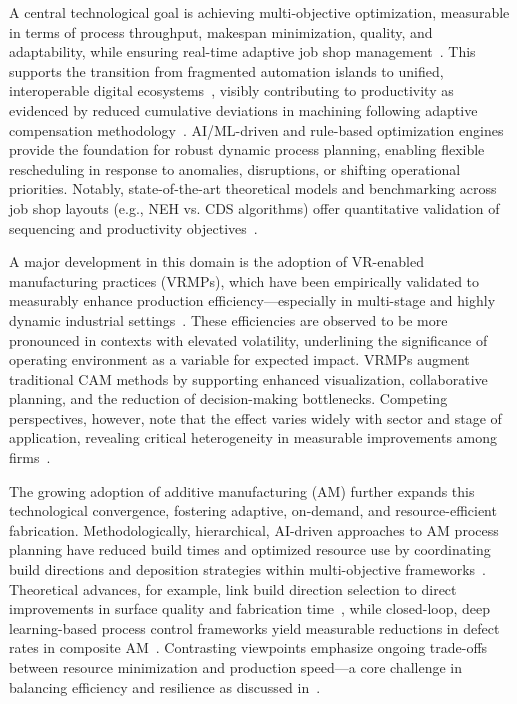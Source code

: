 \documentclass[sigconf]{acmart}
\begin{document}
A central technological goal is achieving multi-objective optimization, measurable in terms of process throughput, makespan minimization, quality, and adaptability, while ensuring real-time adaptive job shop management~\cite{ref19,ref59}. This supports the transition from fragmented automation islands to unified, interoperable digital ecosystems~\cite{ref4,ref11,ref16,ref18,ref19,ref20,ref27,ref28,ref29,ref30,ref38,ref44,ref45,ref49,ref51,ref55,ref59,ref60,ref61,ref70}, visibly contributing to productivity as evidenced by reduced cumulative deviations in machining following adaptive compensation methodology~\cite{ref15}. AI/ML-driven and rule-based optimization engines provide the foundation for robust dynamic process planning, enabling flexible rescheduling in response to anomalies, disruptions, or shifting operational priorities. Notably, state-of-the-art theoretical models and benchmarking across job shop layouts (e.g., NEH vs. CDS algorithms) offer quantitative validation of sequencing and productivity objectives~\cite{ref19}.

A major development in this domain is the adoption of VR-enabled manufacturing practices (VRMPs), which have been empirically validated to measurably enhance production efficiency—especially in multi-stage and highly dynamic industrial settings~\cite{ref83}. These efficiencies are observed to be more pronounced in contexts with elevated volatility, underlining the significance of operating environment as a variable for expected impact. VRMPs augment traditional CAM methods by supporting enhanced visualization, collaborative planning, and the reduction of decision-making bottlenecks. Competing perspectives, however, note that the effect varies widely with sector and stage of application, revealing critical heterogeneity in measurable improvements among firms~\cite{ref83}.

The growing adoption of additive manufacturing (AM) further expands this technological convergence, fostering adaptive, on-demand, and resource-efficient fabrication. Methodologically, hierarchical, AI-driven approaches to AM process planning have reduced build times and optimized resource use by coordinating build directions and deposition strategies within multi-objective frameworks~\cite{ref2,ref5,ref6,ref7,ref15,ref20,ref27,ref44,ref47,ref48,ref52,ref58,ref59,ref69,ref84}. Theoretical advances, for example, link build direction selection to direct improvements in surface quality and fabrication time~\cite{ref51}, while closed-loop, deep learning-based process control frameworks yield measurable reductions in defect rates in composite AM~\cite{ref58}. Contrasting viewpoints emphasize ongoing trade-offs between resource minimization and production speed—a core challenge in balancing efficiency and resilience as discussed in~\cite{ref84}.
\end{document}

